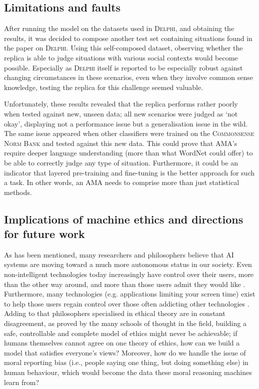 \documentclass[final]{clv3} %
\begin{document}
\subsection{Limitations and faults}

After running the model on the datasets used in \textsc{Delphi}, and obtaining the results, it was decided to compose another test set containing situations found in the paper on \textsc{Delphi}. Using this self-composed dataset, observing whether the replica is able to judge situations with various social contexts would become possible. Especially as \textsc{Delphi} itself is reported to be especially robust against changing circumstances in these scenarios, even when they involve common sense knowledge, testing the replica for this challenge seemed valuable.

Unfortunately, these results revealed that the replica performs rather poorly when tested against new, unseen data; all new scenarios were judged as ‘not okay’, displaying not a performance issue but a generalisation issue in the wild. The same issue appeared when other classifiers were trained on the \textsc{Commonsense Norm Bank} and tested against this new data. This could prove that AMA’s require deeper language understanding (more than what WordNet could offer) to be able to correctly judge any type of situation. Furthermore, it could be an indicator that layered pre-training and fine-tuning is the better approach for such a task.  In other words, an AMA needs to comprise more than just statistical methods. 

\subsection{Implications of machine ethics and directions for future work
}

As has been mentioned, many researchers and philosophers believe \cite{allen2005, tegmark} that AI systems are moving toward a much more autonomous status in our society. Even non-intelligent technologies today increasingly have control over their users, more than the other way around, and more than those users admit they would like \cite{ryan}. Furthermore, many technologies (e.g. applications limiting your screen time) exist to help those users regain control over those often addicting other technologies \cite{winkelman}. Adding to that philosophers specialised in ethical theory are in constant disagreement, as proved by the many schools of thought in the field, building a safe, controllable and complete model of ethics might never be achievable; if humans themselves cannot agree on one theory of ethics, how can we build a model that satisfies everyone’s views? Moreover, how do we handle the issue of moral reporting bias (i.e., people saying one thing, but doing something else) in human behaviour, which would become the data these moral reasoning machines learn from?\\
\end{document}
